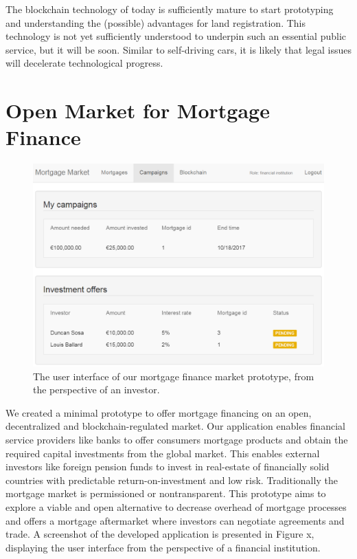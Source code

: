 \documentclass[USenglish]{article}
\begin{document}
The blockchain technology of today is sufficiently mature to start prototyping and understanding the (possible) advantages for land registration. 
This technology is not yet sufficiently understood to underpin such an essential public service, but it will be soon.
Similar to self-driving cars, it is likely that legal issues will decelerate technological progress.

\section{Open Market for Mortgage Finance}

\begin{figure}[t]
	\centering
	\includegraphics[width=1\columnwidth]{assets/mortgagemarket}
	\caption{The user interface of our mortgage finance market prototype, from the perspective of an investor.}
	\label{fig:mortgage_market_interface}
\end{figure}

We created a minimal prototype to offer mortgage financing on an open, decentralized and blockchain-regulated market.
Our application enables financial service providers like banks to offer consumers mortgage products and obtain the required capital investments from the global market.
This enables external investors like foreign pension funds to invest in real-estate of financially solid countries with predictable return-on-investment and low risk.
Traditionally the mortgage market is permissioned or nontransparent.
This prototype aims to explore a viable and open alternative to decrease overhead of mortgage processes and offers a mortgage aftermarket where investors can negotiate agreements and trade.
A screenshot of the developed application is presented in Figure x, displaying the user interface from the perspective of a financial institution.
\end{document}
